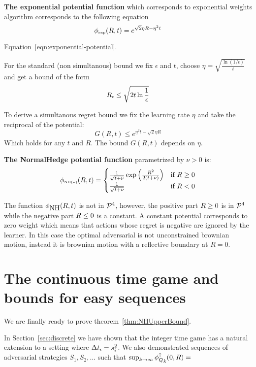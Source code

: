 \documentclass{article}[12pt]
\begin{document}
{\bf The exponential potential function} which corresponds to exponential
  weights algorithm corresponds to the following equation
\begin{equation} \label{eqn:exponential-potential}
    \phi_{\mbox{\tiny exp}}(R,t) = e^{\sqrt{2} \eta R - \eta^2 t}
\end{equation}

Equation~\ref{eqn:exponential-potential}.

For the standard (non simultanous) bound we fix $\epsilon$ and $t$,
choose $\eta = \sqrt{\frac{\ln (1/\epsilon)}{t}}$
and get a bound of the form 
  \begin{equation}
    R_\epsilon \leq \sqrt{2 t \ln \frac{1}{\epsilon}}
  \end{equation}

  To derive a simultanous regret bound we fix the learning rate $\eta$ and take the reciprocal of the potential:
 \[
    G(R,t) \leq e^{\eta^2 t - \sqrt{2}\eta R}
 \]
Which holds for any $t$ and $R$. The bound $G(R,t)$ depends on $\eta$.

  
{\bf The NormalHedge potential function} parametrized by $\nu>0$ is:
\begin{equation} \label{eqn:NormalHedge}
  \phi_{\mbox{\tiny NH$(\nu)$}}(R,t) = \begin{cases}
    \frac{1}{\sqrt{t+\nu}}\exp\left(\frac{R^2}{2(t+\nu)}\right)
    & \mbox{if } R \geq 0  \\
  \frac{1}{\sqrt{t+\nu}} & \mbox{if } R <0
  \end{cases}
\end{equation}

The function $\phi_{\mbox{NH}}(R,t)$ is not in ${\cal P}^{4}$, however, the
positive part $R\geq 0$ is in ${\cal P}^{4}$ while the negative part
$R \leq 0$ is a constant. A constant potential corresponds to zero weight which means that actions whose regret is negative are ignored by the learner. In this case the optimal adversarial is not unconstrained brownian motion, instead it is brownian motion with a reflective boundary at $R=0$.

\section{The continuous time game and bounds for easy
  sequences} \label{sec:easy}

We are finally ready to prove theorem~\ref{thm:NHUpperBound}.

In Section~\ref{sec:discrete} we have shown that the integer time game
has a natural extension to a setting where $\Delta t_i = s_i^2$. We
also demonstrated sequences of adversarial strategies $S_1,S_2,\ldots$
such that $\sup_{k \to \infty} {\phi_{Q}^{\uparrow}}_k(0,R) = $
\end{document}
